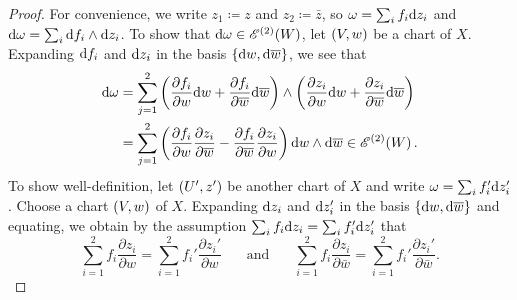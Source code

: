 \documentclass[../Moduli_Spaces_of_Riemann_Surfaces.tex]{subfiles}
\begin{document}
    \vspace{-0.05in}
    \begin{proof}
        For convenience, we write $z_1\coloneqq z$ and $z_2\coloneqq\bar{z}$, so $\omega=\sum_if_i\mathrm{d} z_i$ and $\mathrm{d}\omega=\sum_i\mathrm{d} f_i\wedge\mathrm{d} z_i$. To show that $\mathrm{d}\omega\in\mathscr{E}^{\left(2\right)}\!\left(W\right)$, let $\left(V,w\right)$ be a chart of $X$. Expanding $\mathrm{d} f_i$ and $\mathrm{d} z_i$ in the basis $\left\{\mathrm{d} w,\mathrm{d}\overline{w}\right\}$, we see that
            \begin{equation*}
                \begin{aligned}
                    \mathrm{d}\omega&=\sum_{j=1}^{2}\left(\frac{\partial f_i}{\partial w}\mathrm{d} w+\frac{\partial f_i}{\partial\overline{w}}\mathrm{d}\overline{w}\right)\wedge\left(\frac{\partial z_i}{\partial w}\mathrm{d} w+\frac{\partial z_i}{\partial\overline{w}}\mathrm{d}\overline{w}\right) \\
                            &=\sum_{j=1}^{2}\left(\frac{\partial f_i}{\partial w}\frac{\partial z_i}{\partial\overline{w}}-\frac{\partial f_i}{\partial\overline{w}}\frac{\partial z_i}{\partial w}\right)\mathrm{d} w\wedge\mathrm{d}\overline{w}\in\mathscr{E}^{\left(2\right)}\!\left(W\right).
                \end{aligned}
            \end{equation*}
        To show well-definition, let $\left(U',z'\right)$ be another chart of $X$ and write $\omega=\sum_if_i'\mathrm{d} z_i'$. Choose a chart $\left(V,w\right)$ of $X$. Expanding $\mathrm{d} z_i$ and $\mathrm{d} z_i'$ in the basis $\left\{\mathrm{d} w,\mathrm{d}\overline{w}\right\}$ and equating, we obtain by the assumption $\sum_if_i\mathrm{d} z_i=\sum_if_i'\mathrm{d} z_i'$ that
        \begin{equation*}
            \sum_{i=1}^{2}f_i\frac{\partial z_i}{\partial w}=\sum_{i=1}^{2}f_i'\frac{\partial z_i'}{\partial w}\ \ \ \ \ \ \ \ \textrm{and}\ \ \ \ \ \ \ \ \sum_{i=1}^{2}f_i\frac{\partial z_i}{\partial\bar{w}}=\sum_{i=1}^{2}f_i'\frac{\partial z_i'}{\partial\bar{w}}.

\end{equation*}
\end{proof}
\end{document}
